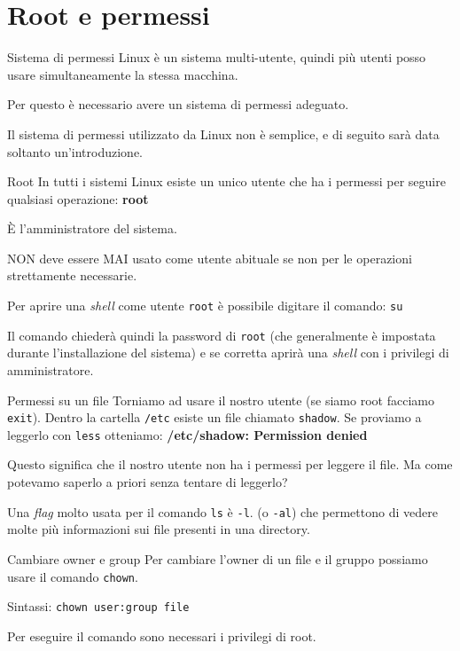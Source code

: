 \section{Root e permessi}

\begin{frame}{Sistema di permessi}
  Linux è un sistema multi-utente, quindi più utenti posso usare simultaneamente la stessa macchina. \bigskip

  Per questo è necessario avere un sistema di permessi 
  adeguato.\bigskip

  Il sistema di permessi utilizzato da Linux non è semplice, e di seguito sarà data soltanto un'introduzione.\bigskip
\end{frame}

\begin{frame}{Root}
  In tutti i sistemi Linux esiste un unico utente che ha i permessi per seguire
  qualsiasi operazione: \textbf{root}\bigskip

  È l'amministratore del sistema.\bigskip

  NON deve essere MAI usato come utente abituale se non per le operazioni strettamente
  necessarie.\bigskip

  Per aprire una \textit{shell} come utente \texttt{root} è possibile digitare
  il comando: \texttt{su}\bigskip

  Il comando chiederà quindi la password di \texttt{root} (che generalmente è
  impostata durante l'installazione del sistema) e se corretta aprirà una 
  \textit{shell} con i privilegi di amministratore.
\end{frame}

\begin{frame}{Permessi su un file}
  Torniamo ad usare il nostro utente (se siamo root facciamo \texttt{exit}). 
  Dentro la cartella \texttt{/etc} esiste un file chiamato \texttt{shadow}. 
  Se proviamo a leggerlo con \texttt{less} otteniamo: \textbf{/etc/shadow: 
  Permission denied}\bigskip

  Questo significa che il nostro utente non ha i permessi per leggere il file.
  Ma come potevamo saperlo a priori senza tentare di leggerlo?\bigskip

  Una \textit{flag} molto usata per il comando \texttt{ls} è 
  \texttt{-l}. (o \texttt{-al}) che permettono di vedere molte più informazioni 
  sui file presenti in una directory.
\end{frame}

\begin{frame}{Cambiare owner e group}
  Per cambiare l'owner di un file e il gruppo possiamo usare il comando 
  \texttt{chown}.\bigskip

  Sintassi: \texttt{chown user:group file}\bigskip

  Per eseguire il comando sono necessari i privilegi di root.
\end{frame}

